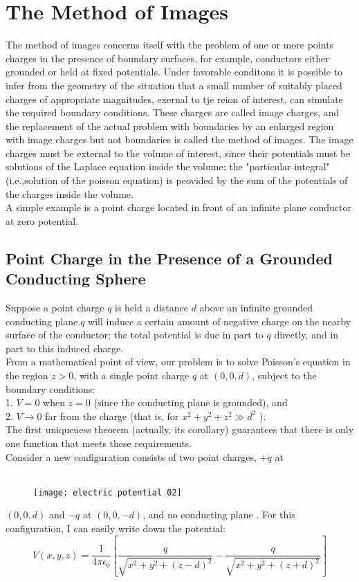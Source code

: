 \section{The Method of Images}
 The method of images concerns itself with the problem of one or more points charges in the presence of boundary surfaces, for example, conductors either grounded or held at fixed potentials. Under favorable conditons it is possible to infer from the geometry of the situation that a small number of suitably placed charges of appropriate magnitudes, exernal to tje reion of interest, can simulate the required boundary conditions. These charges are called image charges, and the replacement of the actual problem with boundaries by an enlarged region with image charges but not boundaries is called the method of images. The image charges must be external to the volume of interest, since their potentials must be solutions of the Laplace equation inside the volume; the "particular integral" (i.e.,solution of the poisson equation) is peovided by the sum of the potentials of the charges inside the volume.\\
A simple example is a point charge located in front of an infinite plane conductor at zero potential. 
\subsection{Point Charge in the Presence of a Grounded Conducting Sphere}
Suppose a point charge $q$ is held a distance $d$ above an infinite grounded conducting plane.$q$ will induce a certain amount of negative charge on the nearby surface of the conductor; the total potential is due in part to $q$ directly, and in part to this induced charge.\\
From a mathematical point of view, our problem is to solve Poisson's equation in the region $z>0$, with a single point charge $q$ at $(0,0, d)$, subject to the boundary conditions:\\
1. $V=0$ when $z=0$ (since the conducting plane is grounded), and\\
2. $V \rightarrow 0$ far from the charge (that is, for $x^{2}+y^{2}+z^{2} \gg d^{2}$ ).\\
The first uniqueness theorem (actually, its corollary) guarantees that there is only one function that meets these requirements.\\
Consider a new configuration consists of two point charges, $+q$ at \\\
\begin{figure}[H]
	\centering
	\texttt{[image: electric potential 02]}
	\caption{}
	\label{}
\end{figure}
$(0,0, d)$ and $-q$ at $(0,0,-d)$, and no conducting plane . For this configuration, I can easily write down the potential:
\begin{equation}
V(x, y, z)=\frac{1}{4 \pi \epsilon_{0}}\left[\frac{q}{\sqrt{x^{2}+y^{2}+(z-d)^{2}}}-\frac{q}{\sqrt{x^{2}+y^{2}+(z+d)^{2}}}\right]\label{image charge 1}
\end{equation}

